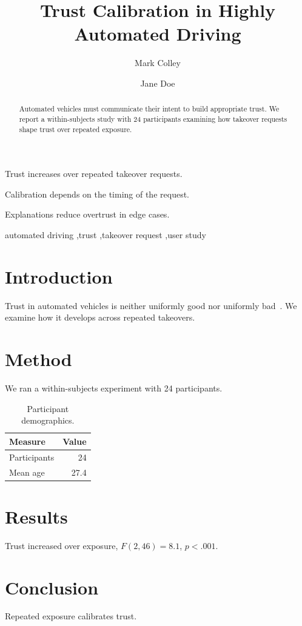 \documentclass[preprint,12pt]{elsarticle}
\begin{document}
\begin{frontmatter}

\title{Trust Calibration in Highly Automated Driving}

\author{Mark Colley}

\author{Jane Doe}

\begin{abstract}
Automated vehicles must communicate their intent to build appropriate trust.
We report a within-subjects study with 24 participants examining how takeover
requests shape trust over repeated exposure.
\end{abstract}

\begin{highlights}
\item Trust increases over repeated takeover requests.
\item Calibration depends on the timing of the request.
\item Explanations reduce overtrust in edge cases.
\end{highlights}

\begin{keyword}
automated driving \sep trust \sep takeover request \sep user study
\end{keyword}

\end{frontmatter}

\section{Introduction}
Trust in automated vehicles is neither uniformly good nor uniformly
bad~\cite{lee2004trust}. We examine how it develops across repeated takeovers.

\section{Method}
We ran a within-subjects experiment with 24 participants.

\begin{table}[t]
  \caption{Participant demographics.}
  \label{tab:demographics}
  \begin{tabular}{lr}
    \toprule
    Measure & Value \\
    \midrule
    Participants & 24 \\
    Mean age & 27.4 \\
    \bottomrule
  \end{tabular}
\end{table}

\section{Results}
Trust increased over exposure, $F(2,46) = 8.1$, $p < .001$.

\section{Conclusion}
Repeated exposure calibrates trust.



\end{document}
